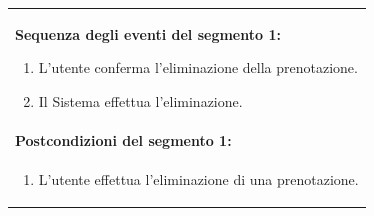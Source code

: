 \documentclass{article}
\begin{document}
\begin{table}[H]
\begin{tabular}{|p{\linewidth}|}
                        \vspace{-5pt} \\
                        \hline
                        \textbf{Sequenza degli eventi del segmento 1:}
                        \begin{enumerate}
                            \item L'utente conferma l'eliminazione della prenotazione.
                            \item Il Sistema effettua l'eliminazione.
                        \end{enumerate} \\
                        \hline
                        \cellcolor{gray!20}
                        \textbf{Postcondizioni del segmento 1:} \\
                        \cellcolor{gray!20}
                        \begin{minipage}{\linewidth}
                            \begin{enumerate}
                                \item L'utente effettua l'eliminazione di una prenotazione.
                            \end{enumerate}
                        \end{minipage} \\
                        \hline
                    \end{tabular}
                \end{table}
\end{document}
